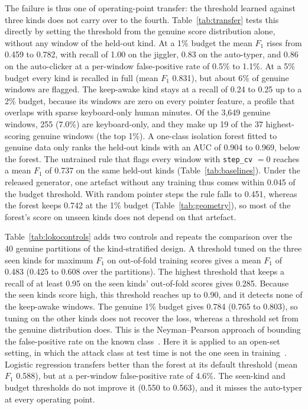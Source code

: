 \documentclass[sensors,article,submit,pdftex,oneauthor]{Definitions/mdpi}
\begin{document}
The failure is thus one of operating-point transfer: the threshold learned against three kinds does not carry over to the fourth. Table~\ref{tab:transfer} tests this directly by setting the threshold from the genuine score distribution alone, without any window of the held-out kind. At a 1\% budget the mean $F_1$ rises from 0.459 to 0.782, with recall of 1.00 on the jiggler, 0.83 on the auto-typer, and 0.86 on the auto-clicker at a per-window false-positive rate of 0.5\% to 1.1\%. At a 5\% budget every kind is recalled in full (mean $F_1$ 0.831), but about 6\% of genuine windows are flagged. The keep-awake kind stays at a recall of 0.24 to 0.25 up to a 2\% budget, because its windows are zero on every pointer feature, a profile that overlaps with sparse keyboard-only human minutes. Of the 3,649 genuine windows, 255 (7.0\%) are keyboard-only, and they make up 19 of the 37 highest-scoring genuine windows (the top 1\%). A one-class isolation forest fitted to genuine data only ranks the held-out kinds with an AUC of 0.904 to 0.969, below the forest. The untrained rule that flags every window with \texttt{step\_cv} $= 0$ reaches a mean $F_1$ of 0.737 on the same held-out kinds (Table~\ref{tab:baselines}). Under the released generator, one artefact without any training thus comes within 0.045 of the budget threshold. With random pointer steps the rule falls to 0.451, whereas the forest keeps 0.742 at the 1\% budget (Table~\ref{tab:geometry}), so most of the forest's score on unseen kinds does not depend on that artefact.



Table~\ref{tab:lokocontrols} adds two controls and repeats the comparison over the 40 genuine partitions of the kind-stratified design. A threshold tuned on the three seen kinds for maximum $F_1$ on out-of-fold training scores gives a mean $F_1$ of 0.483 (0.425 to 0.608 over the partitions). The highest threshold that keeps a recall of at least 0.95 on the seen kinds' out-of-fold scores gives 0.285. Because the seen kinds score high, this threshold reaches up to 0.90, and it detects none of the keep-awake windows. The genuine 1\% budget gives 0.784 (0.765 to 0.803), so tuning on the other kinds does not recover the loss, whereas a threshold set from the genuine distribution does. This is the Neyman--Pearson approach of bounding the false-positive rate on the known class~\cite{tong2018neyman}. Here it is applied to an open-set setting, in which the attack class at test time is not the one seen in training~\cite{scheirer2013openset}. Logistic regression transfers better than the forest at its default threshold (mean $F_1$ 0.588), but at a per-window false-positive rate of 4.6\%. The seen-kind and budget thresholds do not improve it (0.550 to 0.563), and it misses the auto-typer at every operating point.
\end{document}
